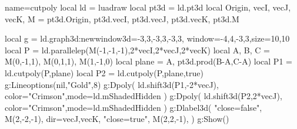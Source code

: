 \begin{luadraw}{name=cutpoly}
local ld = luadraw
local pt3d = ld.pt3d
local Origin, vecI, vecJ, vecK, M = pt3d.Origin, pt3d.vecI, pt3d.vecJ, pt3d.vecK, pt3d.M

local g = ld.graph3d:new{window3d={-3,3,-3,3,-3,3}, window={-4,4,-3,3},size={10,10}}
local P = ld.parallelep(M(-1,-1,-1),2*vecI,2*vecJ,2*vecK)
local A, B, C = M(0,-1,1), M(0,1,1), M(1,-1,0)
local plane = {A, pt3d.prod(B-A,C-A)}
local P1 = ld.cutpoly(P,plane)
local P2 = ld.cutpoly(P,plane,true)
g:Lineoptions(nil,"Gold",8)
g:Dpoly( ld.shift3d(P1,-2*vecJ), {color="Crimson",mode=ld.mShadedHidden} )
g:Dpoly( ld.shift3d(P2,2*vecJ), {color="Crimson",mode=ld.mShadedHidden} )
g:Dlabel3d(
    "close=false", M(2,-2,-1), {dir={vecJ,vecK}},
    "close=true", M(2,2,-1), {} )
g:Show()
\end{luadraw}
